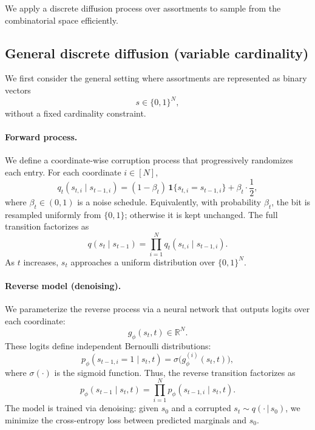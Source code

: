 \documentclass[11pt]{article}
\begin{document}
We apply a discrete diffusion process \citep{austin2021structured} over assortments to sample from the combinatorial space efficiently.
\subsection{General discrete diffusion (variable cardinality)}
We first consider the general setting where assortments are represented as binary vectors
\begin{equation*}
s \in \{0,1\}^N,
\end{equation*}
without a fixed cardinality constraint.

\paragraph{Forward process.}
We define a coordinate-wise corruption process that progressively randomizes each entry. For each coordinate $i \in [N]$,
\begin{equation*}
q_t(s_{t,i} \mid s_{t-1,i})=(1-\beta_t)\,\mathbf{1}\{s_{t,i} = s_{t-1,i}\}
+
\beta_t \cdot \frac{1}{2},
\end{equation*}
where $\beta_t \in (0,1)$ is a noise schedule. Equivalently, with probability $\beta_t$, the bit is resampled uniformly from $\{0,1\}$; otherwise it is kept unchanged. The full transition factorizes as
\begin{equation*}
q(s_t \mid s_{t-1})=\prod_{i=1}^N q_t(s_{t,i} \mid s_{t-1,i}).
\end{equation*}
As $t$ increases, $s_t$ approaches a uniform distribution over $\{0,1\}^N$.

\paragraph{Reverse model (denoising).}
We parameterize the reverse process via a neural network that outputs logits over each coordinate:
\begin{equation*}
g_\phi(s_t, t) \in \mathbb{R}^N.
\end{equation*}
These logits define independent Bernoulli distributions:
\begin{equation*}
p_\phi(s_{t-1,i} = 1 \mid s_t, t)=\sigma\bigl(g_\phi^{(i)}(s_t, t)\bigr),
\end{equation*}
where $\sigma(\cdot)$ is the sigmoid function. Thus, the reverse transition factorizes as
\begin{equation*}
p_\phi(s_{t-1} \mid s_t, t)=\prod_{i=1}^N p_\phi(s_{t-1,i} \mid s_t, t).
\end{equation*}
The model is trained via denoising: given $s_0$ and a corrupted $s_t \sim q(\cdot\,|\, s_0)$, we minimize the cross-entropy loss between predicted marginals and $s_0$.
\end{document}
